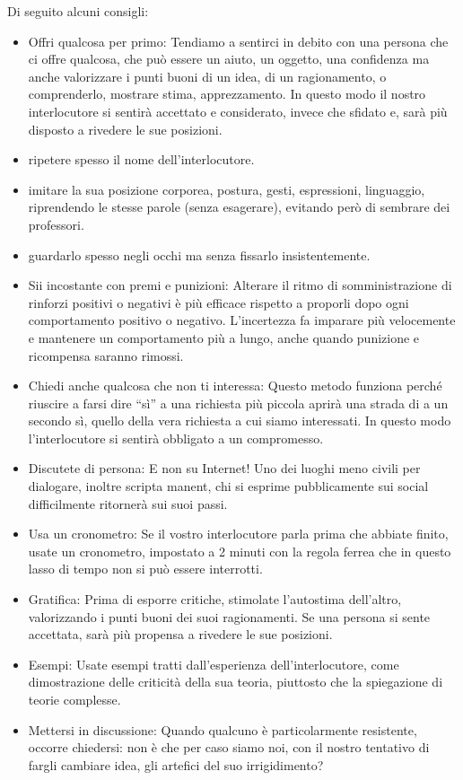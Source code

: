 \documentclass[12pt]{book} %
\begin{document}
Di seguito alcuni consigli:

\begin{itemize}
\item Offri qualcosa per primo: Tendiamo a sentirci in debito con una persona che ci offre qualcosa, che può essere un
aiuto, un oggetto, una confidenza ma anche valorizzare i punti buoni di un idea, di un ragionamento, o comprenderlo,
mostrare stima, apprezzamento. In questo modo il nostro interlocutore si sentirà accettato e considerato, invece che
sfidato e, sarà più disposto a rivedere le sue posizioni.
\item ripetere spesso il nome dell'interlocutore.
\item imitare la sua posizione corporea, postura, gesti, espressioni, linguaggio, riprendendo le stesse parole (senza
esagerare), evitando però di sembrare dei professori.
\item guardarlo spesso negli occhi ma senza fissarlo insistentemente.
\item Sii incostante con premi e punizioni: Alterare il ritmo di somministrazione di rinforzi positivi o negativi è più
efficace rispetto a proporli dopo ogni comportamento positivo o negativo. L'incertezza fa imparare più velocemente e
mantenere un comportamento più a lungo, anche quando punizione e ricompensa saranno
rimossi.
\item Chiedi anche qualcosa che non ti interessa: Questo metodo funziona perché riuscire a farsi dire “sì” a una
richiesta più piccola aprirà una strada di a un secondo sì, quello della vera richiesta a cui siamo interessati. In
questo modo l'interlocutore si sentirà obbligato a un compromesso.
\item Discutete di persona: E non su Internet! Uno dei luoghi meno civili per dialogare, inoltre scripta manent, chi si
esprime pubblicamente sui social difficilmente ritornerà sui suoi passi.
\item Usa un cronometro: Se il vostro interlocutore parla prima che abbiate finito, usate un cronometro, impostato a 2
minuti con la regola ferrea che in questo lasso di tempo non si può essere interrotti.
\item Gratifica: Prima di esporre critiche, stimolate l'autostima dell'altro, valorizzando i punti buoni dei suoi
ragionamenti. Se una persona si sente accettata, sarà più propensa a rivedere le sue posizioni.
\item Esempi: Usate esempi tratti dall'esperienza dell'interlocutore, come dimostrazione delle criticità della sua
teoria, piuttosto che la spiegazione di teorie complesse.
\item Mettersi in discussione: Quando qualcuno è particolarmente resistente, occorre chiedersi: non è che per caso siamo
noi, con il nostro tentativo di fargli cambiare idea, gli artefici del suo irrigidimento?
\end{itemize}
\end{document}
